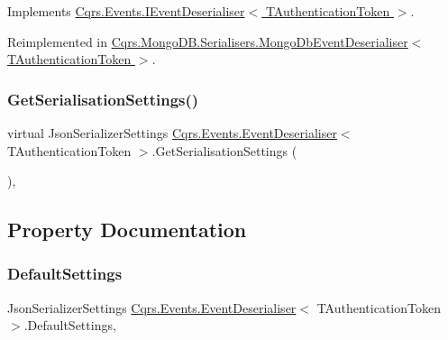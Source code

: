 Implements \hyperlink{interfaceCqrs_1_1Events_1_1IEventDeserialiser_af9216046631ed941bb96b58a0cc27f22_af9216046631ed941bb96b58a0cc27f22}{Cqrs.\+Events.\+I\+Event\+Deserialiser$<$ T\+Authentication\+Token $>$}.



Reimplemented in \hyperlink{classCqrs_1_1MongoDB_1_1Serialisers_1_1MongoDbEventDeserialiser_a2ea63367d97bf66e3dffcabb8c53005e_a2ea63367d97bf66e3dffcabb8c53005e}{Cqrs.\+Mongo\+D\+B.\+Serialisers.\+Mongo\+Db\+Event\+Deserialiser$<$ T\+Authentication\+Token $>$}.

\mbox{\label{classCqrs_1_1Events_1_1EventDeserialiser_a3f767a1b793ea47bcafd9c64be47619e_a3f767a1b793ea47bcafd9c64be47619e}} 
\subsubsection{\texorpdfstring{Get\+Serialisation\+Settings()}{GetSerialisationSettings()}}
{\footnotesize\ttfamily virtual Json\+Serializer\+Settings \hyperlink{classCqrs_1_1Events_1_1EventDeserialiser}{Cqrs.\+Events.\+Event\+Deserialiser}$<$ T\+Authentication\+Token $>$.Get\+Serialisation\+Settings (\begin{DoxyParamCaption}{ }\end{DoxyParamCaption})\hspace{0.3cm}{\ttfamily [protected]}, {\ttfamily [virtual]}}



\subsection{Property Documentation}
\mbox{\label{classCqrs_1_1Events_1_1EventDeserialiser_a08bd067ca7ce8c28c7a83d444b7e468b_a08bd067ca7ce8c28c7a83d444b7e468b}} 
\subsubsection{\texorpdfstring{Default\+Settings}{DefaultSettings}}
{\footnotesize\ttfamily Json\+Serializer\+Settings \hyperlink{classCqrs_1_1Events_1_1EventDeserialiser}{Cqrs.\+Events.\+Event\+Deserialiser}$<$ T\+Authentication\+Token $>$.Default\+Settings\hspace{0.3cm}{\ttfamily [static]}, {\ttfamily [get]}}

